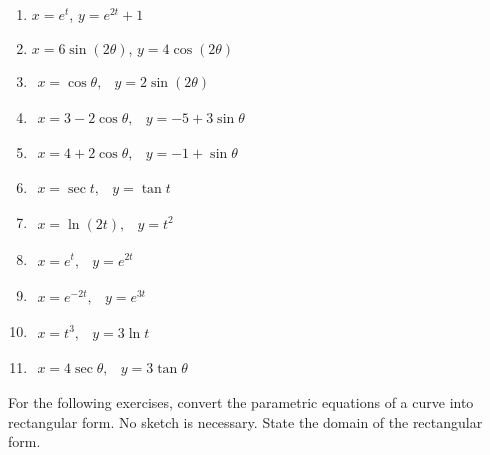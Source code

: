 \documentclass{exercises}
\begin{document}
\begin{enumerate}[resume]
\item $x=e^{t}$, $y=e^{2t}+1$
\item $x=6\sin(2\theta)$, $y=4\cos(2\theta)$
\item $\begin{matrix}x=\cos \theta, & y=2\sin(2\theta)\end{matrix}$
\item $\begin{matrix}x=3-2\cos \theta, & y=-5+3\sin \theta \end{matrix}$
\item $\begin{matrix}x=4+2\cos \theta, & y=-1+\sin \theta \end{matrix}$
\item $\begin{matrix}x=\sec t, & y=\tan t\end{matrix}$
\item $\begin{matrix}x=\ln(2t), & y=t^{2}\end{matrix}$
\item $\begin{matrix}x=e^{t}, & y=e^{2t}\end{matrix}$
\item $\begin{matrix}x=e^{-2t}, & y=e^{3t}\end{matrix}$
\item $\begin{matrix}x=t^{3}, & y=3\ln t\end{matrix}$
\item $\begin{matrix}x=4\sec \theta, & y=3\tan \theta \end{matrix}$
\end{enumerate}

For the following exercises, convert the parametric equations of a curve into rectangular form. No sketch is necessary. State the domain of the rectangular form.
\end{document}
